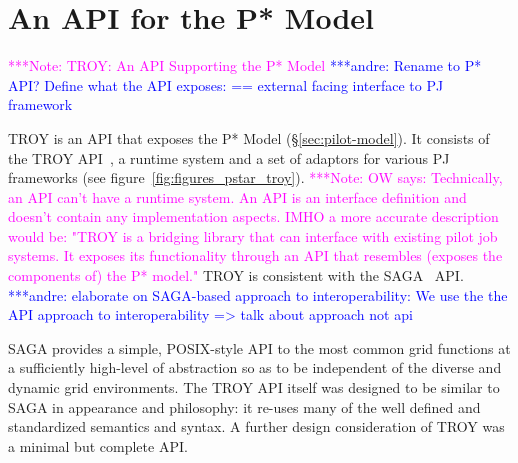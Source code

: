 \documentclass[conference,final]{IEEEtran}
\newcommand{\terminology}[1]{ {\textcolor{red} {(Terminology used: \textbf{#1}) }}}
\newcommand{\jhanote}[1]{ {\textcolor{red} { ***shantenu: #1 }}}
\newcommand{\alnote}[1]{ {\textcolor{blue} { ***andre: #1 }}}
\newcommand{\amnote}[1]{ {\textcolor{blue} { ***andre2: #1 }}}
\newcommand{\msnote}[1]{ {\textcolor{cyan} { ***mark: #1 }}}
\newcommand{\note}[1]{ {\textcolor{magenta} { ***Note: #1 }}}
\newcommand{\terminology}[1]{}
\newcommand{\alnote}[1]{}
\newcommand{\amnote}[1]{}
\newcommand{\jhanote}[1]{}
\newcommand{\msnote}[1]{}
\newcommand{\note}[1]{}
\newcommand{\cu}{CU\xspace}
\newcommand{\upp}{\vspace*{-0.5em}}
\begin{document}
\upp

\section{An API for the P*  Model\upp\upp}
\note{TROY: An API Supporting the P* Model}
\alnote{Rename to P* API? Define what the API exposes: == external facing
interface to PJ framework}







TROY is an API that exposes the P* Model
(\S\ref{sec:pilot-model}). It consists of the TROY
API~\cite{troy_api}, a runtime system and a set of adaptors for
various PJ frameworks (see figure~\ref{fig:figures_pstar_troy}). 
\note{OW says: Technically, an API can't have a runtime system.
An API is an interface definition and doesn't contain any implementation aspects.
IMHO a more accurate description would be: "TROY is a bridging library that can
interface with existing pilot job systems. It exposes its functionality 
through an API that resembles (exposes the components of) the P* model."}
TROY is consistent with the SAGA~\cite{saga_url,saga_gfd90} API. 
\alnote{elaborate on SAGA-based approach to interoperability: We use the the API 
approach to interoperability => talk about approach not api}


SAGA provides a simple, POSIX-style API to the most common grid
functions at a sufficiently high-level of abstraction so as to be
independent of the diverse and dynamic grid environments. The TROY API
itself was designed to be similar to SAGA in appearance and
philosophy: it re-uses many of the well defined and standardized
semantics and syntax. A further design consideration of TROY was a
minimal but complete API.
\end{document}

